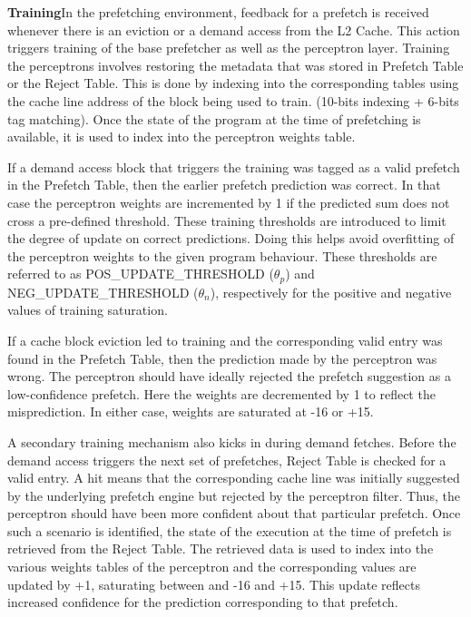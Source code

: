 

\textbf{Training}\newline In the prefetching environment, feedback for a
prefetch is received whenever there is an eviction or a demand access from the
L2 Cache.  This action triggers training of the base prefetcher as well as the
perceptron layer.  Training the perceptrons involves restoring
the metadata that was stored in Prefetch Table or the Reject Table.  This is
done by indexing into the corresponding tables using the cache line address
of the block being used to train. (10-bits indexing + 6-bits tag matching).
Once the state of the program at the time of prefetching is available, it is
used to index into the perceptron weights table.

If a demand access block that triggers the training was tagged as a valid
prefetch in the Prefetch Table, then the earlier prefetch prediction was
correct.  In that case the perceptron weights are incremented by 1 
if the predicted sum does not cross a pre-defined threshold. These training 
thresholds are introduced to limit the degree of update on correct predictions.
Doing this helps avoid overfitting of the perceptron weights to the given program 
behaviour. These thresholds are referred to as POS\_UPDATE\_THRESHOLD ($\theta_p$) and 
NEG\_UPDATE\_THRESHOLD ($\theta_n$),  respectively for the positive and 
negative values of training saturation.

If a cache block
eviction led to training and the corresponding valid entry was found in the
Prefetch Table, then the prediction made by the perceptron was wrong.  The
perceptron should have ideally rejected the prefetch suggestion as a
low-confidence prefetch.  Here the weights are decremented by 1 to reflect the
misprediction. In either case, weights are saturated at -16 or +15.

A secondary training mechanism also kicks in during demand fetches.  Before
the demand access triggers the next set of prefetches, Reject Table is
checked for a valid entry.  A hit means that the corresponding cache line was
initially suggested by the underlying prefetch engine but rejected by the
perceptron filter.  Thus, the perceptron should have been more confident
about that particular prefetch.  Once such a scenario is identified, the state
of the execution at the time of prefetch is retrieved from the Reject Table.
The retrieved data is used to index into the various weights tables of the
perceptron and the corresponding values are updated by +1, saturating between
and -16 and +15.  This update reflects increased confidence for the prediction
corresponding to that prefetch.

